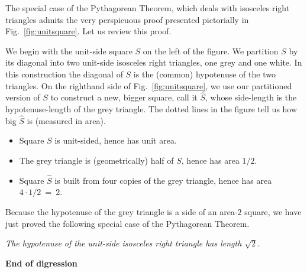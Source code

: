 
The special case of the Pythagorean Theorem, which deals with
isosceles right triangles admits the very perspicuous proof presented
pictorially in Fig.~\ref{fig:unitsquare}.  Let us review this proof.

We begin with the unit-side square $S$ on the left of the figure.  We
partition $S$ by its diagonal into two unit-side isosceles right
triangles, one grey and one white.  In this construction the diagonal
of $S$ is the (common) hypotenuse of the two triangles.  On the
righthand side of Fig.~\ref{fig:unitsquare}, we use our partitioned
version of $S$ to construct a new, bigger square, call it
$\widehat{S}$, whose side-length is the hypotenuse-length of the grey
triangle.  The dotted lines in the figure tell us how big
$\widehat{S}$ is (measured in area).
\begin{itemize}
\item
Square $S$ is unit-sided, hence has unit area.
\item
The grey triangle is (geometrically) half of $S$, hence has area
$1/2$.
\item
Square $\widehat{S}$ is built from four copies of the grey
triangle, hence has area $4 \cdot 1/2 \ = \ 2$.
\end{itemize}
Because the hypotenuse of the grey triangle is a side of an area-$2$
square, we have just proved the following special case of the
Pythagorean Theorem.

{\em The hypotenuse of the unit-side isosceles right triangle has length $\sqrt{2}$.}
\smallskip
  
\noindent \textbf{End of digression}
\bigskip
  

